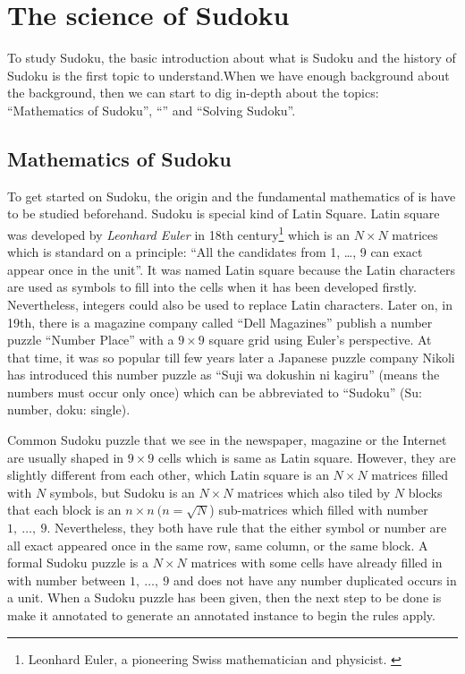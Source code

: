 \documentclass[11pt]{report}
\begin{document}
\section{The science of Sudoku}
\label{sec:introLiterature}
 
To study Sudoku, the basic introduction about what is Sudoku and the history of Sudoku is the first topic to understand.When we have enough background about the background, then we can start to dig in-depth about the topics: ``Mathematics of Sudoku'', ``'' and ``Solving Sudoku''.

\subsection{Mathematics of Sudoku}
\label{sec:background}
To get started on Sudoku, the origin and the fundamental mathematics of is have to be studied beforehand. Sudoku is special kind of Latin Square\cite{website:LatinSquare}. Latin square was developed by \textit{Leonhard Euler} in 18th century\footnote{Leonhard Euler, a pioneering Swiss mathematician and physicist. \cite{website:LeonhardEuler}} which is an $N \times N$ matrices which is standard on a principle: ``All the candidates from 1, \dots , 9 can exact appear once in the unit''. It was named Latin square because the Latin characters are used as symbols to fill into the cells\cite{Delahay2006Science} when it has been developed firstly. Nevertheless, integers could also be used to replace Latin characters. Later on, in 19th, there is a magazine company called ``Dell Magazines'' publish a number puzzle ``Number Place'' with a $9 \times 9$ square grid using Euler's perspective. At that time, it was so popular till few years later a Japanese puzzle company Nikoli has introduced this number puzzle as ``Suji wa dokushin ni kagiru'' (means the numbers must occur only once) which can be abbreviated to ``Sudoku'' (Su: number, doku: single)\cite{GarciaPalomino2007SolvingSudoku}. 

Common Sudoku puzzle that we see in the newspaper, magazine or the Internet are usually shaped in $9 \times 9$ cells which is same as Latin square. However, they are slightly different from each other, which Latin square is an $N \times N$ matrices filled with $N$ symbols, but Sudoku is an  $N \times N$ matrices which also tiled by $N$ blocks that each block is an $n \times n \ (n = \sqrt{N}$) sub-matrices which filled with number $1,\ \dots ,\ 9$. Nevertheless, they both have rule that the either symbol or number are all exact appeared once in the same row, same column, or the same block. A formal Sudoku puzzle is a $N \times N$ matrices with some cells have already filled in with number between $1,\ \dots ,\ 9$ and does not have any number duplicated occurs in a unit. When a Sudoku puzzle has been given, then the next step to be done is make it annotated to generate an annotated instance to begin the rules apply.
\end{document}
